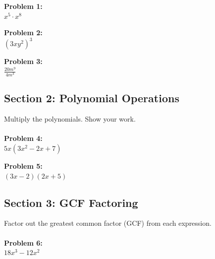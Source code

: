 \documentclass[12pt]{article}
\begin{document}
            \textbf{Problem 1:}\\
            
            $x^5 \cdot x^8$
            
            \vspace{4cm}
            
            \textbf{Problem 2:}\\
            
            $(3xy^2)^3$
            
            \vspace{4cm}
            
            \textbf{Problem 3:}\\
            
            $\frac{20m^9}{4m^3}$
            
            \newpage

        \subsection*{Section 2: Polynomial Operations}
            
            Multiply the polynomials. Show your work.\\\\
            
            \textbf{Problem 4:}\\
            
            $5x(3x^2 - 2x + 7)$
            
            \vspace{4cm}
            
            \textbf{Problem 5:}\\
            
            $(3x - 2)(2x + 5)$
            
            \newpage

        \subsection*{Section 3: GCF Factoring}
            
            Factor out the greatest common factor (GCF) from each expression.\\\\
            
            \textbf{Problem 6:}\\
            
            $18x^3 - 12x^2$
            
\end{document}
